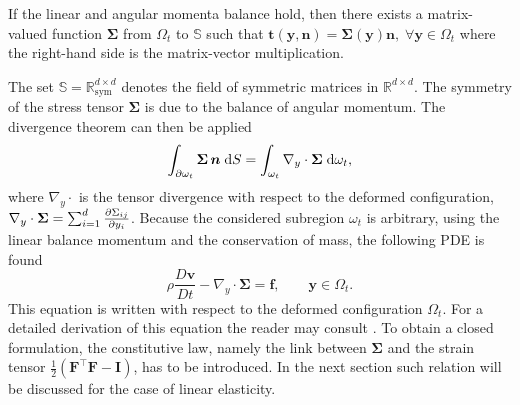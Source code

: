 \begin{theorem}
If the linear and angular momenta balance hold, then there exists a matrix-valued function $\bm{\Sigma}$ from $\Omega_t$ to $\mathbb{S}$ such
that $\bm{t}(\bm{y}, \bm{n}) = \bm{\Sigma}(\bm{y}) \bm{n}, \; \forall \bm{y} \in \Omega_t$ where the right-hand side is the matrix-vector multiplication.
\end{theorem}
The set $\mathbb{S}=\mathbb{R}^{d\times d}_{\mathrm{sym}}$ denotes the field of symmetric matrices in $\mathbb{R}^{d\times d}$. The symmetry of the stress tensor $\bm{\Sigma}$ is due to the balance of angular momentum. The divergence theorem can then be applied
\begin{equation*}
\int_{\partial \omega_t} \bm{\Sigma} \, \bm{n} \d{S} = \int_{\omega_t} \nabla_y \cdot\bm{\Sigma} \d{\omega_t},
\end{equation*}
where $\nabla_y \cdot$ is the tensor divergence with respect to the deformed configuration, $\nabla_y \cdot\bm{\Sigma} = \sum_{i=1}^{d}\diffp{\Sigma_{ij}}{y_i}$.
Because the considered subregion $\omega_t$ is arbitrary, using the linear balance momentum and the conservation of mass, the following PDE is found
\begin{equation*}
	\rho \frac{D\bm{v}}{Dt} - \nabla_y \cdot{\bm{\Sigma}} = \bm{f}, \qquad \bm{y} \in \Omega_t.
\end{equation*}
This equation is written with respect to the deformed configuration $\Omega_t$. For a detailed derivation of this equation the reader may consult \cite[Chapter 4]{abeyaratne2012notes}. To obtain a closed formulation, the constitutive law, namely the link between $\bm{\Sigma}$ and the strain tensor $\frac{1}{2} (\bm{F}^\top \bm{F} - \bm{I})$, has to be introduced. In the next section such relation will be discussed for the case of linear elasticity.

